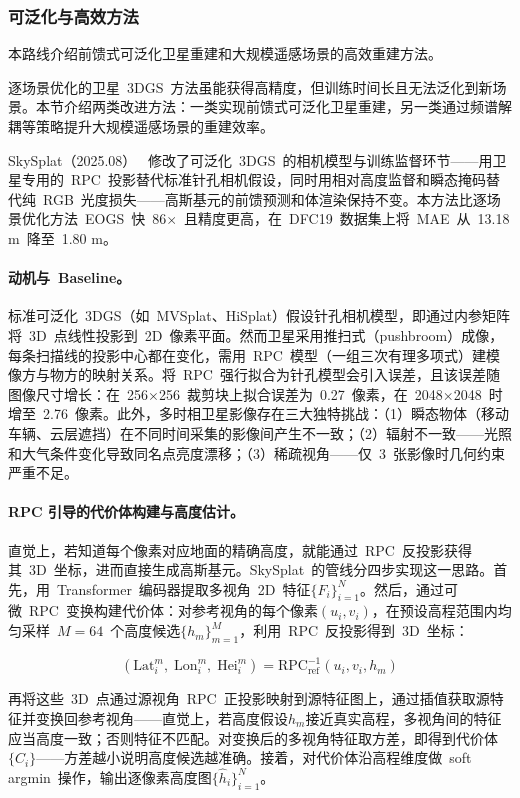 \subsubsection{可泛化与高效方法}

本路线介绍前馈式可泛化卫星重建和大规模遥感场景的高效重建方法。

逐场景优化的卫星~3DGS~方法虽能获得高精度，但训练时间长且无法泛化到新场景。本节介绍两类改进方法：一类实现前馈式可泛化卫星重建，另一类通过频谱解耦等策略提升大规模遥感场景的重建效率。

SkySplat（2025.08）~\cite{2508_09479} 修改了可泛化~3DGS~的相机模型与训练监督环节——用卫星专用的~RPC~投影替代标准针孔相机假设，同时用相对高度监督和瞬态掩码替代纯~RGB~光度损失——高斯基元的前馈预测和体渲染保持不变。本方法比逐场景优化方法~EOGS~快~86$\times$~且精度更高，在~DFC19~数据集上将~MAE~从~13.18 m~降至~1.80 m。

\paragraph{动机与~Baseline。}标准可泛化~3DGS（如~MVSplat、HiSplat）假设针孔相机模型，即通过内参矩阵将~3D~点线性投影到~2D~像素平面。然而卫星采用推扫式（pushbroom）成像，每条扫描线的投影中心都在变化，需用~RPC~模型（一组三次有理多项式）建模像方与物方的映射关系。将~RPC~强行拟合为针孔模型会引入误差，且该误差随图像尺寸增长：在~256$\times$256~裁剪块上拟合误差为~0.27~像素，在~2048$\times$2048~时增至~2.76~像素。此外，多时相卫星影像存在三大独特挑战：（1）瞬态物体（移动车辆、云层遮挡）在不同时间采集的影像间产生不一致；（2）辐射不一致——光照和大气条件变化导致同名点亮度漂移；（3）稀疏视角——仅~3~张影像时几何约束严重不足。

\paragraph{RPC 引导的代价体构建与高度估计。}直觉上，若知道每个像素对应地面的精确高度，就能通过~RPC~反投影获得其~3D~坐标，进而直接生成高斯基元。SkySplat~的管线分四步实现这一思路。首先，用~Transformer~编码器提取多视角~2D~特征$\{F_i\}_{i=1}^N$。然后，通过可微~RPC~变换构建代价体：对参考视角的每个像素$(u_i, v_i)$，在预设高程范围内均匀采样~$M=64$~个高度候选$\{h_m\}_{m=1}^M$，利用~RPC~反投影得到~3D~坐标：

\begin{equation}
(\text{Lat}_{i}^{m},\;\text{Lon}_{i}^{m},\;\text{Hei}_{i}^{m}) = \text{RPC}_{\text{ref}}^{-1}(u_i, v_i, h_m)
\end{equation}

再将这些~3D~点通过源视角~RPC~正投影映射到源特征图上，通过插值获取源特征并变换回参考视角——直觉上，若高度假设$h_m$接近真实高程，多视角间的特征应当高度一致；否则特征不匹配。对变换后的多视角特征取方差，即得到代价体$\{C_i\}$——方差越小说明高度候选越准确。接着，对代价体沿高程维度做~soft argmin~操作，输出逐像素高度图$\{\hat{h}_i\}_{i=1}^N$。

